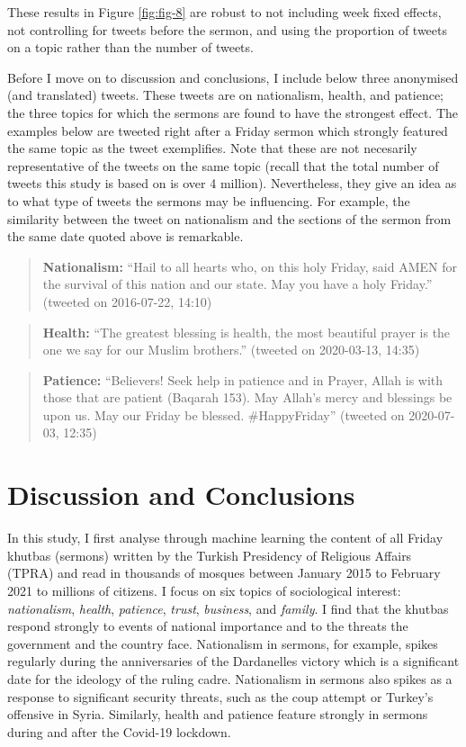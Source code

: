 \documentclass[
  12pt,
]{article}
\begin{document}
These results in Figure \ref{fig:fig-8} are robust to not including week fixed effects, not controlling for tweets before the sermon, and using the proportion of tweets on a topic rather than the number of tweets.

Before I move on to discussion and conclusions, I include below three anonymised (and translated) tweets. These tweets are on nationalism, health, and patience; the three topics for which the sermons are found to have the strongest effect. The examples below are tweeted right after a Friday sermon which strongly featured the same topic as the tweet exemplifies. Note that these are not necesarily representative of the tweets on the same topic (recall that the total number of tweets this study is based on is over 4 million). Nevertheless, they give an idea as to what type of tweets the sermons may be influencing. For example, the similarity between the tweet on nationalism and the sections of the sermon from the same date quoted above is remarkable.

\begin{quote}
\textbf{Nationalism:} ``Hail to all hearts who, on this holy Friday, said AMEN for the survival of this nation and our state. May you have a holy Friday.'' (tweeted on 2016-07-22, 14:10)
\end{quote}

\begin{quote}
\textbf{Health:} ``The greatest blessing is health, the most beautiful prayer is the one we say for our Muslim brothers.'' (tweeted on 2020-03-13, 14:35)
\end{quote}

\begin{quote}
\textbf{Patience:} ``Believers! Seek help in patience and in Prayer, Allah is with those that are patient (Baqarah 153). May Allah's mercy and blessings be upon us. May our Friday be blessed. \#HappyFriday'' (tweeted on 2020-07-03, 12:35)
\end{quote}

\hypertarget{discussion-and-conclusions}{%
\section{Discussion and Conclusions}\label{discussion-and-conclusions}}

In this study, I first analyse through machine learning the content of all Friday khutbas (sermons) written by the Turkish Presidency of Religious Affairs (TPRA) and read in thousands of mosques between January 2015 to February 2021 to millions of citizens. I focus on six topics of sociological interest: \emph{nationalism}, \emph{health}, \emph{patience}, \emph{trust}, \emph{business}, and \emph{family}. I find that the khutbas respond strongly to events of national importance and to the threats the government and the country face. Nationalism in sermons, for example, spikes regularly during the anniversaries of the Dardanelles victory which is a significant date for the ideology of the ruling cadre. Nationalism in sermons also spikes as a response to significant security threats, such as the coup attempt or Turkey's offensive in Syria. Similarly, health and patience feature strongly in sermons during and after the Covid-19 lockdown.
\end{document}
